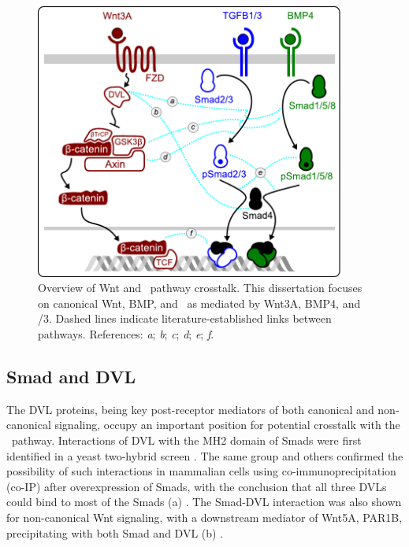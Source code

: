   \begin{figure}[!bt]
  \centering
  \includegraphics[width=4in]{FIGS/pathways/tgfb_wnt_xtalk.pdf}
  {\singlespacing 
  \caption[Overview of Wnt and \tgfbsf\ pathway crosstalk]
        { Overview
          of Wnt and \tgfbsf\ pathway crosstalk. 
          This dissertation focuses on canonical Wnt, BMP, and \tgf\, as mediated by Wnt3A,
          BMP4, and /3. Dashed lines indicate
          literature-established
          links between pathways. References:
          \textit{a}\cite{Warner2003,Warner2005a,Liu2006};
          \textit{b}\cite{Mamidi2012};
          \textit{c}\cite{Fuentealba2007,Guo2008};
          \textit{d}\cite{Furuhashi2001,Guo2008,Liu2006b};
          \textit{e}\cite{Candia1997};
          \textit{f}\cite{Zeng2008}.}
  \label{fig:pathways:xtalk}}
  \end{figure}




\subsection{Smad and DVL}
\label{pathways:wntTgfb:dvl}

The DVL proteins, being key post-receptor mediators
of both canonical and non-canonical signaling, occupy
an important position for potential crosstalk with
the \tgfbsf\ pathway. Interactions of DVL with
the MH2 domain of Smads were first identified in a yeast two-hybrid
screen \cite{Warner2003}. The same group and others confirmed
the possibility of such interactions in mammalian cells using
co-immunoprecipitation (co-IP) after overexpression of Smads, with the
conclusion that all three DVLs could bind to most of the
Smads (a) \cite{Warner2003,Warner2005a,Liu2006}. The Smad-DVL
interaction was also shown for non-canonical Wnt signaling,
with a downstream mediator of Wnt5A, PAR1B, precipitating with both
Smad and DVL (b) \cite{Mamidi2012}.


